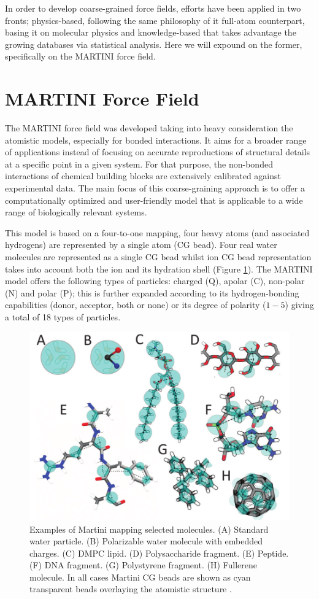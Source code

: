 \documentclass[
	12pt,				%
	openright,			%
	twoside,			%
	a4paper,			%
	english,			%
	french,				%
	spanish,			%
	brazil,				%
	]{abntex2}
\begin{document}
In order to develop coarse-grained force fields, efforts have been applied in two fronts; physics-based, following the same philosophy of it full-atom counterpart, basing it on molecular physics and knowledge-based that takes advantage the growing databases via statistical analysis. Here we will expound on the former, specifically on the MARTINI \cite{Marrink2007} force field.

\section{MARTINI Force Field}

The MARTINI force field was developed taking into heavy consideration the atomistic models, especially for bonded interactions. It aims for a broader range of applications instead of focusing on accurate reproductions of structural details at a specific point in a given system. For that purpose, the non-bonded interactions of chemical building blocks are extensively calibrated against experimental data. The main focus of this coarse-graining approach is to offer a computationally optimized and user-friendly model that is applicable to a wide range of biologically relevant systems.

This model is based on a four-to-one mapping, four heavy atoms (and associated hydrogens) are represented by a single atom (CG bead). Four real water molecules are represented as a single CG bead whilst ion CG bead representation takes into account both the ion and its hydration shell \cite{Marrink2013} (Figure \ref{fig:martini4to1}). The MARTINI model offers the following types of particles: charged (Q), apolar (C), non-polar (N) and polar (P); this is further expanded according to its hydrogen-bonding capabilities (donor, acceptor, both or none) or its degree of polarity ($1-5$) giving a total of 18 types of particles.

\begin{figure}
	\centering
	\includegraphics[width=0.7\linewidth]{figures/martini_4to1}
	\caption{Examples of Martini mapping selected molecules. (A) Standard water particle. (B) Polarizable water molecule with embedded charges. (C) DMPC lipid. (D) Polysaccharide fragment. (E) Peptide. (F) DNA fragment. (G) Polystyrene fragment. (H) Fullerene molecule. In all cases Martini CG beads are shown as cyan transparent beads overlaying the atomistic structure \cite{Marrink2013}.}
	\label{fig:martini4to1}
\end{figure}
\end{document}
